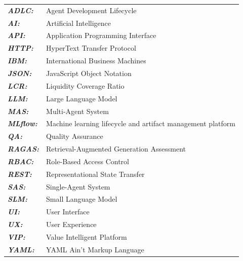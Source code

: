 \begingroup
\renewcommand{\arraystretch}{1.55}
\noindent
\begin{tabular}{@{}p{3cm}p{10cm}@{}}
    \textbf{\textit{ADLC:}} & Agent Development Lifecycle \\
    \textbf{\textit{AI:}} & Artificial Intelligence \\
    \textbf{\textit{API:}} & Application Programming Interface \\
    \textbf{\textit{HTTP:}} & HyperText Transfer Protocol \\
    \textbf{\textit{IBM:}} & International Business Machines \\
    \textbf{\textit{JSON:}} & JavaScript Object Notation \\
    \textbf{\textit{LCR:}} & Liquidity Coverage Ratio \\
    \textbf{\textit{LLM:}} & Large Language Model \\
    \textbf{\textit{MAS:}} & Multi-Agent System \\
    \textbf{\textit{MLflow:}} & Machine learning lifecycle and artifact management platform \\
    \textbf{\textit{QA:}} & Quality Assurance \\
    \textbf{\textit{RAGAS:}} & Retrieval-Augmented Generation Assessment \\
    \textbf{\textit{RBAC:}} & Role-Based Access Control \\
    \textbf{\textit{REST:}} & Representational State Transfer \\
    \textbf{\textit{SAS:}} & Single-Agent System \\
    \textbf{\textit{SLM:}} & Small Language Model \\
    \textbf{\textit{UI:}} & User Interface \\
    \textbf{\textit{UX:}} & User Experience \\
    \textbf{\textit{VIP:}} & Value Intelligent Platform \\
    \textbf{\textit{YAML:}} & YAML Ain't Markup Language \\
\end{tabular}
\endgroup
